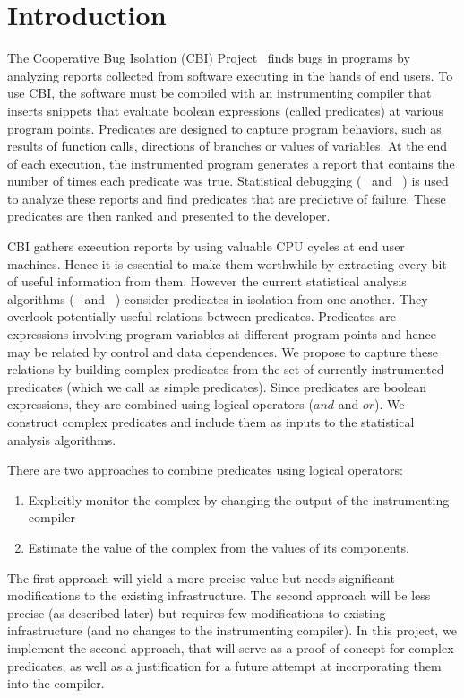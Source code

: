 \section{Introduction}

The Cooperative Bug Isolation (CBI) Project~\cite{Liblit:2004:CBI} finds bugs in programs by analyzing reports collected from software executing in the hands of end users.  To use CBI, the software must be compiled with an instrumenting compiler that inserts snippets that evaluate boolean expressions (called predicates) at various program points.  Predicates are designed to capture program behaviors, such as results of function calls, directions of branches or values of variables.  At the end of each execution, the instrumented program generates a report that contains the number of times each predicate was true.  Statistical debugging (~\cite{Liblit:2005:SSBI} and ~\cite{Zheng:2006:SDSIMB}) is used to analyze these reports and find predicates that are predictive of failure.  These predicates are then ranked and presented to the developer.

CBI gathers execution reports by using valuable CPU cycles at end user machines.  Hence it is essential to make them worthwhile by extracting every bit of useful information from them.  However the current statistical analysis algorithms (~\cite{Liblit:2005:SSBI} and ~\cite{Zheng:2006:SDSIMB}) consider predicates in isolation from one another.  They overlook potentially useful relations between predicates.  Predicates are expressions involving program variables at different program points and hence may be related by control and data dependences.  We propose to capture these relations by building complex predicates from the set of currently instrumented predicates (which we call as simple predicates).  Since predicates are boolean expressions, they are combined using logical operators ($and$ and $or$).  We construct complex predicates and include them as inputs to the statistical analysis algorithms.

There are two approaches to combine predicates using logical operators:
\begin{enumerate}
\item Explicitly monitor the complex by changing the output of the instrumenting compiler
\item Estimate the value of the complex from the values of its components.
\end{enumerate}

The first approach will yield a more precise value but needs significant modifications to the existing infrastructure.  The second approach will be less precise (as described later) but requires few modifications to existing infrastructure (and no changes to the instrumenting compiler).  In this project, we implement the second approach, that will serve as a proof of concept for complex predicates, as well as a justification for a future attempt at incorporating them into the compiler.

